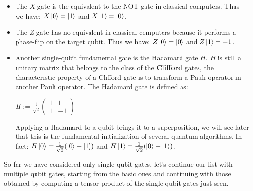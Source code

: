 \documentclass[english]{article}
\begin{document}
			\begin{itemize} 
				\item The $X$ gate is the equivalent to the NOT gate in classical computers. Thus we have: $X\left\vert{0}\right\rangle = \left\vert{1}\right\rangle$ and $X\left\vert{1}\right\rangle = \left\vert{0}\right\rangle$. 
				
				\item The $Z$ gate has no equivalent in classical computers because it performs a phase-flip on the target qubit. Thus we have: $Z\left\vert{0}\right\rangle = \left\vert{0}\right\rangle$ and $Z\left\vert{1}\right\rangle=-1$.
				
				\item Another single-qubit fundamental gate is the Hadamard gate $H$. $H$ is still a unitary matrix that belongs to the class of the \textbf{Clifford} gates, the characteristic property of a Clifford gate is to transform a Pauli operator in another Pauli operator. The Hadamard gate is defined as:
				\begin{center}
					$
					H := \frac{1}{\sqrt{2}}
					\begin{pmatrix}
						1 & 1 \\
						1 & -1
					\end{pmatrix}
					$
				\end{center}
				Applying a Hadamard to a qubit brings it to a superposition, we will see later that this is the fundamental initialization of several quantum algorithms. In fact: $H\left\vert{0}\right\rangle = \frac{1}{\sqrt{2}}(\left\vert{0}\right\rangle+\left\vert{1}\right\rangle)$ and $H\left\vert{1}\right\rangle=\frac{1}{\sqrt{2}}(\left\vert{0}\right\rangle-\left\vert{1}\right\rangle)$. 
			\end{itemize}
			
			So far we have considered only single-qubit gates, let's continue our list with multiple qubit gates, starting from the basic ones and continuing with those obtained by computing a tensor product of the single qubit gates just seen.
			
\end{document}
